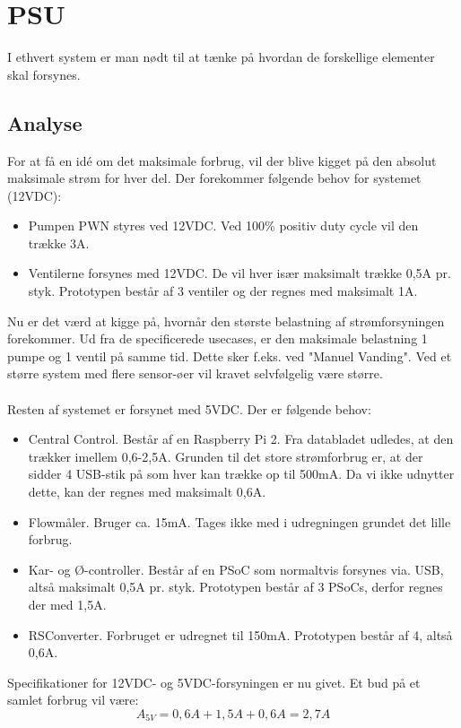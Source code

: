 \section{PSU}
I ethvert system er man nødt til at tænke på hvordan de forskellige elementer skal forsynes.

\subsection{Analyse}
For at få en idé om det maksimale forbrug, vil der blive kigget på den absolut maksimale strøm for hver del. Der forekommer følgende behov for systemet (12VDC):
\begin{itemize}
\item Pumpen PWN styres ved 12VDC. Ved 100\% positiv duty cycle vil den trække 3A.
\item Ventilerne forsynes med 12VDC. De vil hver især maksimalt trække 0,5A pr. styk. Prototypen består af 3 ventiler og der regnes med maksimalt 1A.
\end{itemize}

Nu er det værd at kigge på, hvornår den største belastning af strømforsyningen forekommer. Ud fra de specificerede
usecases, er den maksimale belastning 1 pumpe og 1 ventil på samme tid. Dette sker f.eks. ved "Manuel Vanding". Ved et større system med flere
sensor-øer vil kravet selvfølgelig være større.
\\\\
Resten af systemet er forsynet med 5VDC. Der er følgende behov:
\begin{itemize}
\item Central Control. Består af en Raspberry Pi 2. Fra databladet udledes, at den trækker imellem 0,6-2,5A. Grunden til det store strømforbrug er,
at der sidder 4 USB-stik på som hver kan trække op til 500mA. Da vi ikke udnytter dette, kan der regnes med maksimalt 0,6A.
\item Flowmåler. Bruger ca. 15mA. Tages ikke med i udregningen grundet det lille forbrug.
\item Kar- og Ø-controller. Består af en PSoC som normaltvis forsynes via. USB, altså maksimalt 0,5A pr. styk. Prototypen består af 3 PSoCs, derfor regnes der med 1,5A.
\item RSConverter. Forbruget er udregnet til 150mA. Prototypen består af 4, altså 0,6A.
\end{itemize}

Specifikationer for 12VDC- og 5VDC-forsyningen er nu givet. Et bud på et samlet forbrug vil være:
\begin{equation}
	A_{5V} = 0,6A + 1,5A + 0,6A = 2,7A
\end{equation}

